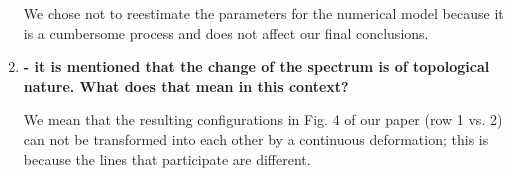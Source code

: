\documentclass{article}
\begin{document}
\begin{enumerate}
	We chose not to reestimate the parameters for the numerical model because it is a cumbersome process and does not affect our final conclusions.
	
	\newpage
	
	\item \textbf{
		- it is mentioned that the change of the spectrum is of topological
		nature. What does that mean in this context?}
	
	We mean that the resulting configurations in Fig. 4 of our paper (row 1 vs. 2) can not be transformed into each other by a continuous deformation; this is because the lines that participate are different.
	
\end{enumerate}
\end{document}
